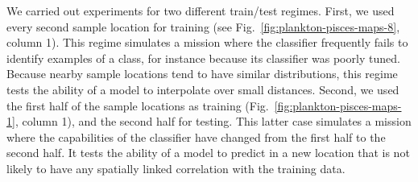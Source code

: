 We carried out experiments for two different train/test regimes. First, we used every second sample location for training (see Fig.~\ref{fig:plankton-pisces-maps-8}, column 1). This regime simulates a mission where the classifier frequently fails to identify examples of a class, for instance because its classifier was poorly tuned. Because nearby sample locations tend to have similar distributions, this regime tests the ability of a model to interpolate over small distances. Second, we used the first half of the sample locations as training (Fig.~\ref{fig:plankton-pisces-maps-1}, column 1), and the second half for testing. This latter case simulates a mission where the capabilities of the classifier have changed from the first half to the second half. It tests the ability of a model to predict in a new location that is not likely to have any spatially linked correlation with the training data.

